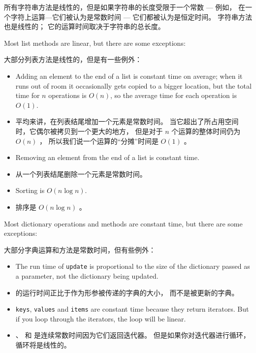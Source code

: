 所有字符串方法是线性的，但是如果字符串的长度受限于一个常数 --- 例如，
在一个字符上运算—它们被认为是常数时间 --- 它们都被认为是恒定时间。 字符串方法  也是线性的； 它的运算时间取决于字符串的总长度。


Most list methods are linear, but there are some exceptions:

大部分列表方法是线性的，但是有一些例外：

\begin{itemize}

\item Adding an element to the end of a list is constant time on
average; when it runs out of room it occasionally gets copied
to a bigger location, but the total time for $n$ operations
is $O(n)$, so the average time for each
operation is $O(1)$.

\item 平均来讲，在列表结尾增加一个元素是常数时间。 当它超出了所占用空间时，它偶尔被拷贝到一个更大的地方， 但是对于 $n$ 个运算的整体时间仍为 $O(n)$ ， 所以我们说一个运算的“分摊”时间是 $O(1)$ 。

\item Removing an element from the end of a list is constant time.

\item 从一个列表结尾删除一个元素是常数时间。

\item Sorting is $O(n \log n)$.

\item 排序是 $O(n \log n)$ 。
  

\end{itemize}

Most dictionary operations and methods are constant time, but
there are some exceptions:

大部分字典运算和方法是常数时间，但有些例外：

\begin{itemize}

\item The run time of {\tt update} is
  proportional to the size of the dictionary passed as a parameter,
  not the dictionary being updated.

\item {} 的运行时间正比于作为形参被传递的字典的大小，
   而不是被更新的字典。

\item {\tt keys}, {\tt values} and {\tt items} are constant time because
  they return iterators.  But if you loop through the iterators, the loop will be linear.

\item {}、  和  是连续常数时间因为它们返回迭代器。
   但是如果你对迭代器进行循环，循环将是线性的。

\end{itemize}

